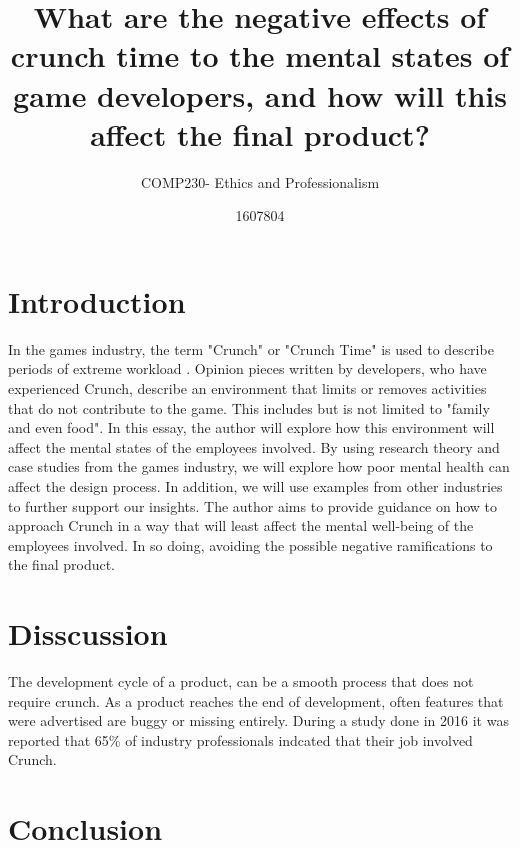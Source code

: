 \documentclass{scrartcl}
\title{What are the negative effects of crunch time to the mental states of game developers, and how will this affect the final product? }
\subtitle{COMP230- Ethics and Professionalism}
\author{1607804}
\begin{document}
\maketitle


\section{Introduction}
In the games industry, the term "Crunch" or "Crunch Time" is used to describe periods of extreme workload \cite[p. 468]{edholm2017crunch}. Opinion pieces written by developers, who have experienced Crunch, describe an environment that limits or removes activities that do not contribute to the game. This includes but is not limited to "family and even food"\cite{schreier_2017}. In this essay, the author will explore how this environment will affect the mental states of the employees involved. By using research theory and case studies from the games industry, we will explore how poor mental health can affect the design process. In addition, we will use examples from other industries to further support our insights. The author aims to provide guidance on how to approach Crunch in a way that will least affect the mental well-being of the employees involved. In so doing, avoiding the possible negative ramifications to the final product.

\section{Disscussion}
The development cycle of a product, can be a smooth process that does not require crunch. As a product reaches the end of development, often features that were advertised are buggy or missing entirely. 
During a study done in 2016 it was reported that 65\%  of  industry professionals indcated that their job involved Crunch\cite[p.20]{weststarlegault2016}. 

\section{Conclusion}



\end{document}
